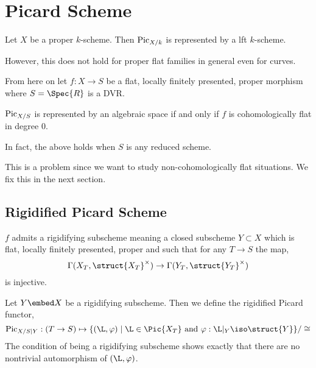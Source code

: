 \documentclass[12pt]{article}
\begin{document}
\section{Picard Scheme}

\begin{theorem}
Let $X$ be a proper $k$-scheme. Then $\fPic_{X/k}$ is represented by a lft $k$-scheme. 
\end{theorem}

\begin{rmk}
However, this does not hold for proper flat families in general even for curves. 
\end{rmk}

From here on let $f : X \to S$ be a flat, locally finitely presented, proper morphism where $S = \Spec{R}$ is a DVR. 

\begin{theorem}[8.3.2]
$\fPic_{X/S}$ is represented by an algebraic space if and only if $f$ is cohomologically flat in degree $0$.
\end{theorem}

\begin{rmk}
In fact, the above holds when $S$ is any reduced scheme.
\end{rmk}

This is a problem since we want to study non-cohomologically flat situations. We fix this in the next section.

\subsection{Rigidified Picard Scheme}

\begin{prop}[8.1.6]
$f$ admits a rigidifying subscheme meaning a closed subscheme $Y \subset X$ which is flat, locally finitely presented, proper and such that for any $T \to S$ the map,
\[ \Gamma(X_T, \struct{X_T}^\times) \to \Gamma(Y_T, \struct{Y_T}^\times) \]
is injective.  
\end{prop}

\newcommand{\fPic}{\mathrm{Pic}}

\begin{defn}
Let $Y \embed X$ be a rigidifying subscheme. Then we define the rigidified Picard  functor,
\[ \fPic_{X/S|Y} : (T \to S) \mapsto \{ (\L, \varphi) \mid \L \in \Pic{X_T} \text{ and } \varphi : \L|_Y \iso \struct{Y} \} / \cong \]
The condition of being a rigidifying subscheme shows exactly that there are no nontrivial automorphism of $(\L, \varphi)$. 
\end{defn}
\end{document}
